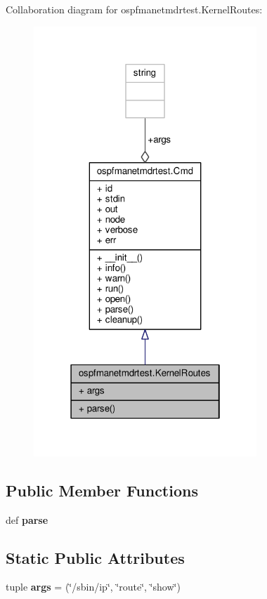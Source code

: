 Collaboration diagram for ospfmanetmdrtest.\+Kernel\+Routes\+:
\nopagebreak
\begin{figure}[H]
\begin{center}
\leavevmode
\includegraphics[width=238pt]{classospfmanetmdrtest_1_1_kernel_routes__coll__graph}
\end{center}
\end{figure}
\subsection*{Public Member Functions}
\begin{DoxyCompactItemize}
\item 
\hypertarget{classospfmanetmdrtest_1_1_kernel_routes_af5140f684abc60902f9f47a510c4840b}{def {\bfseries parse}}\label{classospfmanetmdrtest_1_1_kernel_routes_af5140f684abc60902f9f47a510c4840b}

\end{DoxyCompactItemize}
\subsection*{Static Public Attributes}
\begin{DoxyCompactItemize}
\item 
\hypertarget{classospfmanetmdrtest_1_1_kernel_routes_a0fd3fe922043fa448e7c3b7de69990af}{tuple {\bfseries args} = (\char`\"{}/sbin/ip\char`\"{}, \char`\"{}route\char`\"{}, \char`\"{}show\char`\"{})}\label{classospfmanetmdrtest_1_1_kernel_routes_a0fd3fe922043fa448e7c3b7de69990af}

\end{DoxyCompactItemize}
